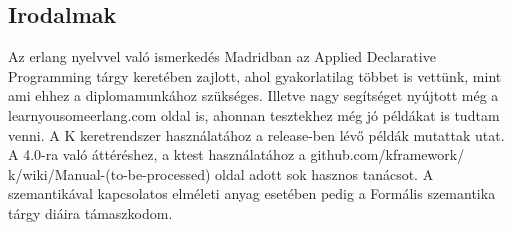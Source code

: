 \documentclass[]{article}
\begin{document}
\subsection*{Irodalmak}
Az erlang nyelvvel való ismerkedés Madridban az Applied Declarative Programming tárgy keretében zajlott, ahol gyakorlatilag többet is vettünk, mint ami ehhez a diplomamunkához szükséges. Illetve nagy segítséget nyújtott még a learnyousomeerlang.com oldal is, ahonnan tesztekhez még jó példákat is tudtam venni. A K keretrendszer használatához a release-ben lévő példák mutattak utat. A 4.0-ra való áttéréshez, a ktest használatához a github.com/kframework/ k/wiki/Manual-(to-be-processed) oldal adott sok hasznos tanácsot. A szemantikával kapcsolatos elméleti anyag esetében pedig a Formális szemantika tárgy diáira támaszkodom.
\end{document}
